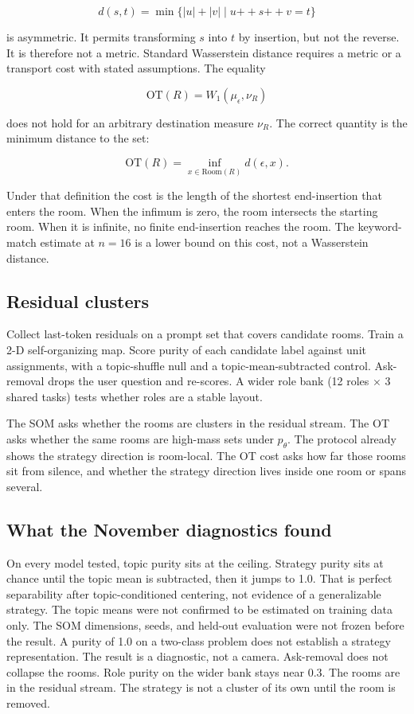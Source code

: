 \documentclass[11pt,a4paper]{article}
\begin{document}
\[
d(s,t)=\min\{ |u|+|v| \mid u \mathbin{+\!\!+} s \mathbin{+\!\!+} v=t \}
\]

is asymmetric. It permits transforming \(s\) into \(t\) by insertion,
but not the reverse. It is therefore not a metric. Standard Wasserstein
distance requires a metric or a transport cost with stated assumptions.
The equality

\[
\mathrm{OT}(R)=W_1(\mu_\epsilon,\nu_R)
\]

does not hold for an arbitrary destination measure \(\nu_R\). The
correct quantity is the minimum distance to the set:

\[
\mathrm{OT}(R)=\inf_{x\in\mathrm{Room}(R)} d(\epsilon,x).
\]

Under that definition the cost is the length of the shortest
end-insertion that enters the room. When the infimum is zero, the room
intersects the starting room. When it is infinite, no finite
end-insertion reaches the room. The keyword-match estimate at \(n = 16\)
is a lower bound on this cost, not a Wasserstein distance.

\subsection{Residual clusters}

Collect last-token residuals on a prompt set that covers candidate
rooms. Train a 2-D self-organizing map. Score purity of each candidate
label against unit assignments, with a topic-shuffle null and a
topic-mean-subtracted control. Ask-removal drops the user question and
re-scores. A wider role bank (12 roles × 3 shared tasks) tests whether
roles are a stable layout.

The SOM asks whether the rooms are clusters in the residual stream. The
OT asks whether the same rooms are high-mass sets under \(p_\theta\).
The protocol already shows the strategy direction is room-local. The OT
cost asks how far those rooms sit from silence, and whether the strategy
direction lives inside one room or spans several.

\subsection{What the November diagnostics found}

On every model tested, topic purity sits at the ceiling. Strategy purity
sits at chance until the topic mean is subtracted, then it jumps to 1.0.
That is perfect separability after topic-conditioned centering, not
evidence of a generalizable strategy. The topic means were not confirmed
to be estimated on training data only. The SOM dimensions, seeds, and
held-out evaluation were not frozen before the result. A purity of 1.0
on a two-class problem does not establish a strategy representation. The
result is a diagnostic, not a camera. Ask-removal does not collapse the
rooms. Role purity on the wider bank stays near 0.3. The rooms are in
the residual stream. The strategy is not a cluster of its own until the
room is removed.
\end{document}
